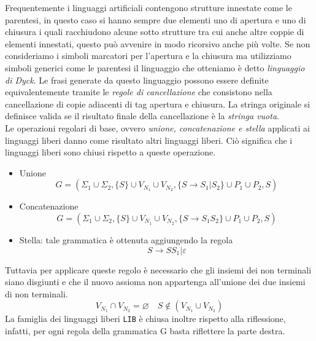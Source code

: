 Frequentemente i linguaggi artificiali contengono strutture innestate come le parentesi, in questo caso si hanno sempre due elementi uno di apertura e uno di chiusura i quali racchiudono alcune sotto strutture tra cui anche altre coppie di elementi innestati, questo può avvenire in modo ricorsivo anche più volte. Se non consideriamo i simboli marcatori per l'apertura e la chiusura ma utilizziamo simboli generici come le parentesi il linguaggio che otteniamo è detto \emph{linguaggio di Dyck}. Le frasi generate da questo linguaggio possono essere definite equivalentemente tramite le \emph{regole di cancellazione} che consistono nella cancellazione di copie adiacenti di tag apertura e chiusura. La stringa originale si definisce valida se il risultato finale della cancellazione è la \emph{stringa vuota}.\\
Le operazioni regolari di base, ovvero \emph{unione, concatenazione e stella} applicati ai linguaggi liberi danno come risultato altri linguaggi liberi. Ciò significa che i linguaggi liberi sono chiusi rispetto a queste operazione.
\begin{itemize}
	\item Unione
	$$G= (\Sigma_1 \cup \Sigma_2, \{S\}\cup V_{N_1} \cup V_{N_2}, \{S \rightarrow S_1|S_2 \} \cup P_1\cup P_2, S)$$
	\item Concatenazione
	$$G= (\Sigma_1 \cup \Sigma_2, \{S\}\cup V_{N_1} \cup V_{N_2}, \{S \rightarrow S_1S_2 \} \cup P_1\cup P_2, S)$$
	\item Stella: tale grammatica è ottenuta aggiungendo la regola 
	$$S\rightarrow SS_1 | \varepsilon$$
\end{itemize}
Tuttavia per applicare queste regolo è necessario che gli insiemi dei non terminali siano disgiunti e che il nuovo assioma non appartenga all'unione dei due insiemi di non terminali.
$$ V_{N_1}\cap V_{N_2} = \varnothing \quad S \notin ( V_{N_1}\cup V_{N_2} )$$
La famiglia dei linguaggi liberi \texttt{LIB} è chiusa inoltre rispetto alla riflessione, infatti, per ogni regola della grammatica G basta riflettere la parte destra.
